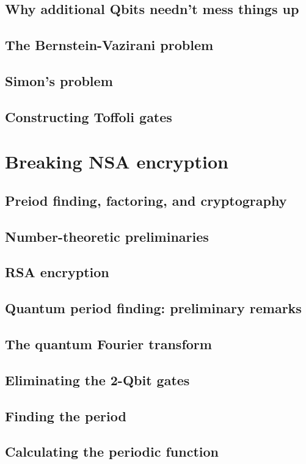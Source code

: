\documentclass{book}
\theoremstyle{definition}
\begin{document}
\subsection{Why additional Qbits needn't mess things up}
\subsection{The Bernstein-Vazirani problem}
\subsection{Simon's problem}
\subsection{Constructing Toffoli gates}


\newpage


\section{Breaking NSA encryption}

\subsection{Preiod finding, factoring, and cryptography}
\subsection{Number-theoretic preliminaries}
\subsection{RSA encryption}
\subsection{Quantum period finding: preliminary remarks}
\subsection{The quantum Fourier transform}
\subsection{Eliminating the 2-Qbit gates}
\subsection{Finding the period}
\subsection{Calculating the periodic function}
\end{document}
